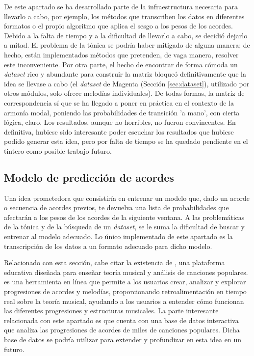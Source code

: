 De este apartado se ha desarrollado parte de la infraestructura necesaria para llevarlo a cabo, por ejemplo, los métodos que transcriben los datos en diferentes formatos o el propio algoritmo que aplica el sesgo a los pesos de los acordes. Debido a la falta de tiempo y a la dificultad de llevarlo a cabo, se decidió dejarlo a mitad. El problema de la tónica se podría haber mitigado de alguna manera; de hecho, están implementados métodos que pretenden, de vaga manera, resolver este inconveniente. Por otra parte, el hecho de encontrar de forma cómoda un \textit{dataset} rico y abundante para construir la matriz bloqueó definitivamente que la idea se llevase a cabo (el \textit{dataset} de Magenta (Sección \ref{sec:dataset}), utilizado por otros módulos, solo ofrece melodías individuales). De todas formas, la matriz de correspondencia sí que se ha llegado a poner en práctica en el contexto de la armonía modal, poniendo las probabilidades de transición 'a mano', con cierta lógica, claro. Los resultados, aunque no horribles, no fueron convincentes. En definitiva, hubiese sido interesante poder escuchar los resultados que hubiese podido generar esta idea, pero por falta de tiempo se ha quedado pendiente en el tintero como posible trabajo futuro. 

\subsection{Modelo de predicción de acordes}\label{sec:arm:prediccion_acordes}

Una idea prometedora que consistiría en entrenar un modelo que, dado un acorde o secuencia de acordes previos, te devuelva una lista de probabilidades que afectarán a los pesos de los acordes de la siguiente ventana. A las problemáticas de la tónica y de la búsqueda de un \textit{dataset}, se le suma la dificultad de buscar y entrenar al modelo adecuado. Lo único implementado de este apartado es la transcripción de los datos a un formato adecuado para dicho modelo.

Relacionado con esta sección, cabe citar la existencia de \cite{hooktheory}, una plataforma educativa diseñada para enseñar teoría musical y análisis de canciones populares. \cite{hooktheory} es una herramienta en línea que permite a los usuarios crear, analizar y explorar progresiones de acordes y melodías, proporcionando retroalimentación en tiempo real sobre la teoría musical, ayudando a los usuarios a entender cómo funcionan las diferentes progresiones y estructuras musicales. La parte interesante relacionada con este apartado es que \cite{hooktheory} cuenta con una base de datos interactiva que analiza las progresiones de acordes de miles de canciones populares. Dicha base de datos se podría utilizar para extender y profundizar en esta idea en un futuro.

